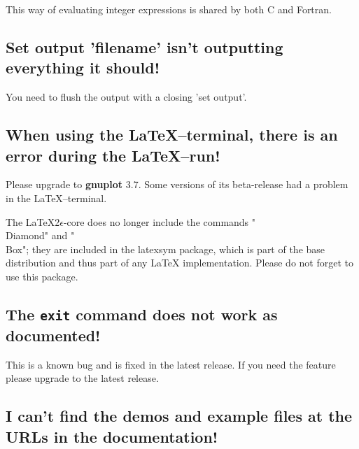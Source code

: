 \documentclass[a4paper,11pt]{article}
\newcommand{\gnuplot}{\textbf{gnuplot}}
\begin{document}
This way of evaluating integer expressions is shared by both C and
Fortran.

%
%
%

\subsection{Set output 'filename' isn't outputting everything it
should!}

You need to flush the output with a closing 'set output'.


\subsection{When using the \LaTeX--terminal, there is an error during
the \LaTeX--run!}

Please upgrade to \gnuplot{} 3.7. Some versions of its beta-release had
a problem in the \LaTeX--terminal.

The \LaTeX 2$\epsilon$-core does no longer include the commands
"\\Diamond" and "\\Box"; they are included in the latexsym package,
which is part of the base distribution and thus part of any LaTeX
implementation.  Please do not forget to use this package.

\subsection{The \texttt{exit} command does not work as documented!}

This is a known bug and is fixed in the latest release. If you need
the feature please upgrade to the latest release.

\subsection{I can't find the demos and example files at the URLs in the
documentation!}
\end{document}
